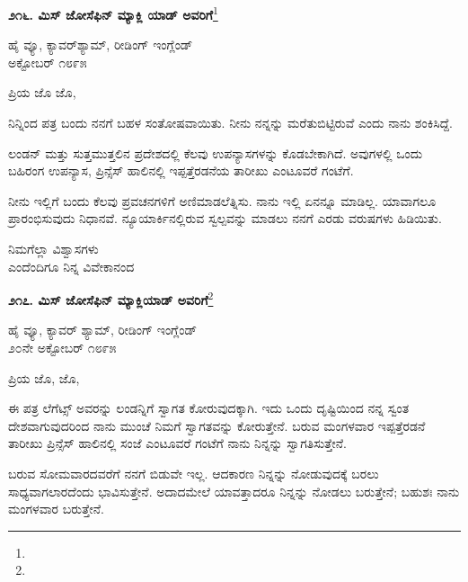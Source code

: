 \begin{center}
\textbf{೨೧೬. ಮಿಸ್ ಜೋಸೆಫಿನ್ ಮ್ಯಾಕ್ಲಿ ಯಾಡ್ ಅವರಿಗೆ}\footnote{}
\end{center}

\vspace{-0.3cm}

\begin{flushright}
ಹೈ ವ್ಯೂ, ಕ್ಯಾವರ್‌ಶ್ಯಾಮ್, ರೀಡಿಂಗ್ ಇಂಗ್ಲೆಂಡ್\\ಅಕ್ಟೋಬರ್ ೧೮೯೫
\end{flushright}

\noindent
ಪ್ರಿಯ ಜೊ ಜೊ,

ನಿನ್ನಿಂದ ಪತ್ರ ಬಂದು ನನಗೆ ಬಹಳ ಸಂತೋಷವಾಯಿತು. ನೀನು ನನ್ನನ್ನು ಮರೆತುಬಿಟ್ಟಿರುವೆ ಎಂದು ನಾನು ಶಂಕಿಸಿದ್ದೆ.

ಲಂಡನ್ ಮತ್ತು ಸುತ್ತಮುತ್ತಲಿನ ಪ್ರದೇಶದಲ್ಲಿ ಕೆಲವು ಉಪನ್ಯಾಸಗಳನ್ನು ಕೊಡಬೇಕಾಗಿದೆ. ಅವುಗಳಲ್ಲಿ ಒಂದು ಬಹಿರಂಗ ಉಪನ್ಯಾಸ, ಪ್ರಿನ್ಸೆಸ್ ಹಾಲಿನಲ್ಲಿ ಇಪ್ಪತ್ತೆರಡನೆಯ ತಾರೀಖು ಎಂಟೂವರೆ ಗಂಟೆಗೆ.

ನೀನು ಇಲ್ಲಿಗೆ ಬಂದು ಕೆಲವು ಪ್ರವಚನಗಳಿಗೆ ಅಣಿಮಾಡಲೆತ್ನಿಸು. ನಾನು ಇಲ್ಲಿ ಏನನ್ನೂ ಮಾಡಿಲ್ಲ. ಯಾವಾಗಲೂ ಪ್ರಾರಂಭಿಸುವುದು ನಿಧಾನವೆ. ನ್ಯೂಯಾರ್ಕಿನಲ್ಲಿರುವ ಸ್ವಲ್ಪವನ್ನು ಮಾಡಲು ನನಗೆ ಎರಡು ವರುಷಗಳು ಹಿಡಿಯಿತು.

\vspace{-0.5cm}

{\flushright
ನಿಮಗೆಲ್ಲಾ ವಿಶ್ವಾಸಗಳು\\ಎಂದೆಂದಿಗೂ ನಿನ್ನ ವಿವೇಕಾನಂದ\par}

\begin{center}
\textbf{೨೧೭. ಮಿಸ್ ಜೋಸೆಫಿನ್ ಮ್ಯಾಕ್ಲಿಯಾಡ್ ಅವರಿಗೆ}\footnote{}
\end{center}

\vspace{-0.5cm}

\begin{flushright}
ಹೈ ವ್ಯೂ, ಕ್ಯಾವರ್ ‌ಶ್ಯಾಮ್, ರೀಡಿಂಗ್ ಇಂಗ್ಲೆಂಡ್\\೨೦ನೇ ಅಕ್ಟೋಬರ್ ೧೮೯೫
\end{flushright}

\noindent
ಪ್ರಿಯ ಜೊ, ಜೊ,

ಈ ಪತ್ರ ಲೆಗೆಟ್ಸ್ ಅವರನ್ನು ಲಂಡನ್ನಿಗೆ ಸ್ವಾಗತ ಕೋರುವುದಕ್ಕಾಗಿ. ಇದು ಒಂದು ದೃಷ್ಟಿಯಿಂದ ನನ್ನ ಸ್ವಂತ ದೇಶವಾಗುವುದರಿಂದ ನಾನು ಮುಂಚೆ ನಿಮಗೆ ಸ್ವಾಗತವನ್ನು ಕೋರುತ್ತೇನೆ. ಬರುವ ಮಂಗಳವಾರ ಇಪ್ಪತ್ತೆರಡನೆ ತಾರೀಖು ಪ್ರಿನ್ಸೆಸ್ ಹಾಲಿನಲ್ಲಿ ಸಂಜೆ ಎಂಟೂವರೆ ಗಂಟೆಗೆ ನಾನು ನಿನ್ನನ್ನು ಸ್ವಾಗತಿಸುತ್ತೇನೆ.

ಬರುವ ಸೋಮವಾರದವರೆಗೆ ನನಗೆ ಬಿಡುವೇ ಇಲ್ಲ. ಆದಕಾರಣ ನಿನ್ನನ್ನು ನೋಡುವುದಕ್ಕೆ ಬರಲು ಸಾಧ್ಯವಾಗಲಾರದೆಂದು ಭಾವಿಸುತ್ತೇನೆ. ಅದಾದಮೇಲೆ ಯಾವತ್ತಾದರೂ ನಿನ್ನನ್ನು ನೋಡಲು ಬರುತ್ತೇನೆ; ಬಹುಶಃ ನಾನು ಮಂಗಳವಾರ ಬರುತ್ತೇನೆ.

